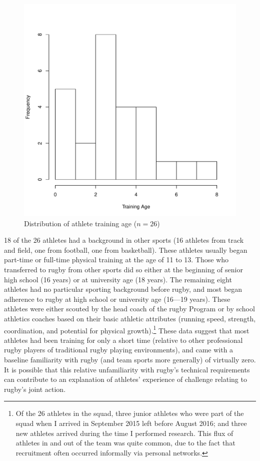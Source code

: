 \begin{CJK}{UTF8}{gbsn}
      \begin{figure}[htbp]
        \begin{center}
          \includegraphics[scale=.3]{images/ethnoTrainingAgeHist.pdf}
            \caption{Distribution of athlete training age ($n = 26$)}
          \end{center}
         \label{fig:ethnoTrainingAgeHist}
      \end{figure}


18 of the 26 athletes had a background in other sports (16 athletes from track and field, one from football, one from basketball).  These athletes usually began part-time or full-time physical training at the age of 11 to 13.  Those who transferred to rugby from other sports did so either at the beginning of senior high school (16 years) or at university age (18 years).  The remaining eight athletes had no particular sporting background before rugby, and most began adherence to rugby at high school or university age (16---19 years).  These athletes were either scouted by the head coach of the rugby Program or by school athletics coaches based on their basic athletic attributes (running speed, strength, coordination, and potential for physical growth).\footnote{Of the 26 athletes in the squad, three junior athletes who were part of the squad when I arrived in September 2015 left before August 2016; and three new athletes arrived during the time I performed research.  This flux of athletes in and out of the team was quite common, due to the fact that recruitment often occurred informally via personal networks.}
These data suggest that most athletes had been training for only a short time (relative to other professional rugby players of traditional rugby playing environments), and came with a baseline familiarity with rugby (and team sports more generally) of virtually zero.  It is possible that this relative unfamiliarity with rugby's technical requirements can contribute to an explanation of athletes' experience of challenge relating to rugby's joint action.


\end{CJK}
